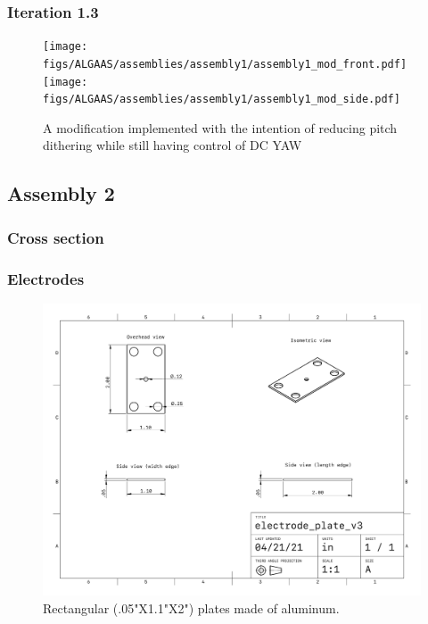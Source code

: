 \subsubsection{Iteration 1.3}
\begin{figure}[!ht]
	\begin{subcaptiongroup}
		\texttt{[image: figs/ALGAAS/assemblies/assembly1/assembly1\_mod\_front.pdf]}
		\label{A1pt3CAD}
		\texttt{[image: figs/ALGAAS/assemblies/assembly1/assembly1\_mod\_side.pdf]}
		\label{A1pt3pic}
	\end{subcaptiongroup}
	\caption{A modification implemented with the intention of reducing pitch dithering while still having control of DC YAW}
	\label{fig:assembly1mod}
\end{figure}

\newpage

\subsection{Assembly 2}
\subsubsection{Cross section}

\subsubsection{Electrodes}

\begin{figure}[H]
  \centering
  \includegraphics[width=.776\textwidth]{figs/ALGAAS/assemblies/assembly2/assembly2_electrode.pdf}
  \caption{Rectangular (.05"X1.1"X2") plates made of aluminum.}
\end{figure}

